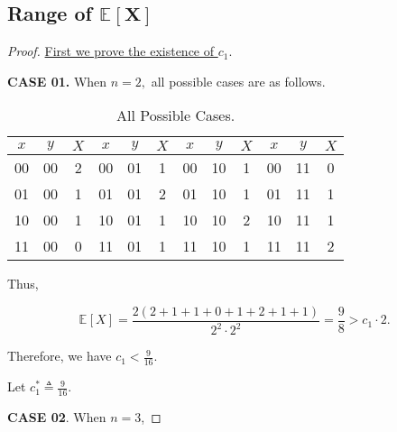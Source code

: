 \documentclass{article}
\newcommand{\staExp}[2]{\mathbb{E}_{#1}\left[#2\right]}
\begin{document}
\vspace{0.5em}
\subsection{Range of $\boldsymbol{\staExp{}{X}}$}
\vspace{1em}
\begin{proof}
    \underline{First we prove the existence of $c_1.$}

    \vspace{0.5em} \hspace{1.3em}
    \textbf{CASE 01.} When $n=2,$ all possible cases are as follows.
    
    \vspace{-0.25em}
    \begin{table}[htbp]
    \centering
    \begin{tabular}{ccc|ccc|ccc|ccc}
        \hline
        $x$ & $y$ & $X$ & $x$ & $y$ & $X$ & $x$ & $y$ & $X$ & $x$ & $y$ & $X$ \\
        \hline 
        00 & 00 & 2 & 00 & 01 & 1 & 00 & 10 & 1 & 00 & 11 & 0 \\
        01 & 00 & 1 & 01 & 01 & 2 & 01 & 10 & 1 & 01 & 11 & 1 \\
        10 & 00 & 1 & 10 & 01 & 1 & 10 & 10 & 2 & 10 & 11 & 1 \\
        11 & 00 & 0 & 11 & 01 & 1 & 11 & 10 & 1 & 11 & 11 & 2 \\
        \hline
    \end{tabular}
    \caption{All Possible Cases.}
    \end{table}
    
    \vspace{-1em} \hspace{1.3em}
    Thus,
    
    \vspace{-1.2em}
    $$\staExp{}{X}=\frac{2\left(2+1+1+0+1+2+1+1\right)}{2^2\cdot2^2} = \frac{9}{8} > c_1\cdot 2.$$
    
    \hspace{1.3em}
    Therefore, we have $c_1 < \frac{9}{16}.$ 
    
    \vspace{2.5em} \hspace{1.3em}
    Let $c_1^*\triangleq\frac{9}{16}.$
    
    \vspace{.5em} \hspace{1.3em}
    \textbf{CASE 02}. When $n=3$, 
    

\end{proof}
\end{document}
